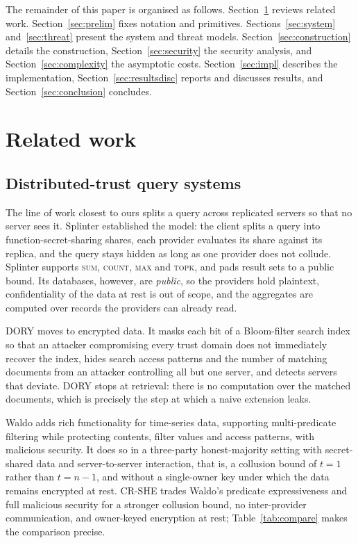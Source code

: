 \documentclass[a4paper,fleqn]{cas-dc}
\begin{document}
The remainder of this paper is organised as follows.
Section~\ref{sec:related} reviews related work. Section~\ref{sec:prelim} fixes
notation and primitives. Sections~\ref{sec:system} and~\ref{sec:threat}
present the system and threat models. Section~\ref{sec:construction} details
the construction, Section~\ref{sec:security} the security analysis, and
Section~\ref{sec:complexity} the asymptotic costs. Section~\ref{sec:impl}
describes the implementation, Section~\ref{sec:resultsdisc} reports and
discusses results, and Section~\ref{sec:conclusion} concludes.

\section{Related work}
\label{sec:related}

\subsection{Distributed-trust query systems}
The line of work closest to ours splits a query across replicated servers so
that no server sees it. Splinter \citep{splinter} established the model: the
client splits a query into function-secret-sharing shares, each provider
evaluates its share against its replica, and the query stays hidden as long as
one provider does not collude. Splinter supports \textsc{sum}, \textsc{count},
\textsc{max} and \textsc{topk}, and pads result sets to a public bound. Its
databases, however, are \emph{public}, so the providers hold plaintext,
confidentiality of the data at rest is out of scope, and the aggregates are
computed over records the providers can already read.

DORY \citep{dory} moves to encrypted data. It masks each bit of a
Bloom-filter search index so that an attacker compromising every trust domain
does not immediately recover the index, hides search access patterns and the
number of matching documents from an attacker controlling all but one server,
and detects servers that deviate. DORY stops at retrieval: there is no
computation over the matched documents, which is precisely the step at which a
naive extension leaks.

Waldo \citep{waldo} adds rich functionality for time-series data, supporting
multi-predicate filtering while protecting contents, filter values and access
patterns, with malicious security. It does so in a three-party honest-majority
setting with secret-shared data and server-to-server interaction, that is, a
collusion bound of $t=1$ rather than $t=n-1$, and without a single-owner key
under which the data remains encrypted at rest. CR-SHE trades Waldo's
predicate expressiveness and full malicious security for a stronger collusion
bound, no inter-provider communication, and owner-keyed encryption at rest;
Table~\ref{tab:compare} makes the comparison precise.
\end{document}

